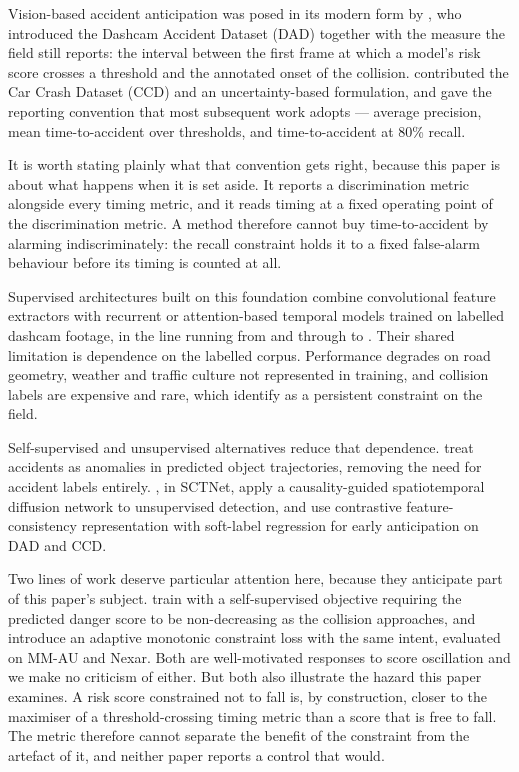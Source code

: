 Vision-based accident anticipation was posed in its modern form by \citet{chan2016dad}, who introduced the Dashcam Accident Dataset (DAD) together with the measure the field still reports: the interval between the first frame at which a model's risk score crosses a threshold and the annotated onset of the collision. \citet{bao2020ccd} contributed the Car Crash Dataset (CCD) and an uncertainty-based formulation, and \citet{karim2022dsta} gave the reporting convention that most subsequent work adopts --- average precision, mean time-to-accident over thresholds, and time-to-accident at 80\% recall.

It is worth stating plainly what that convention gets right, because this paper is about what happens when it is set aside. It reports a discrimination metric alongside every timing metric, and it reads timing at a fixed operating point of the discrimination metric. A method therefore cannot buy time-to-accident by alarming indiscriminately: the recall constraint holds it to a fixed false-alarm behaviour before its timing is counted at all.

Supervised architectures built on this foundation combine convolutional feature extractors with recurrent or attention-based temporal models trained on labelled dashcam footage, in the line running from \citet{chan2016dad} and \citet{bao2020ccd} through \citet{karim2022dsta} to \citet{kandacharam2025fusion}. Their shared limitation is dependence on the labelled corpus. Performance degrades on road geometry, weather and traffic culture not represented in training, and collision labels are expensive and rare, which \citet{zhang2025review} identify as a persistent constraint on the field.

Self-supervised and unsupervised alternatives reduce that dependence. \citet{yao2019unsupervised} treat accidents as anomalies in predicted object trajectories, removing the need for accident labels entirely. \citet{liu2026sctnet}, in SCTNet, apply a causality-guided spatiotemporal diffusion network to unsupervised detection, and \citet{zhong2025early} use contrastive feature-consistency representation with soft-label regression for early anticipation on DAD and CCD.

Two lines of work deserve particular attention here, because they anticipate part of this paper's subject. \citet{pjetri2025nondecreasing} train with a self-supervised objective requiring the predicted danger score to be non-decreasing as the collision approaches, and \citet{zou2026riskprop} introduce an adaptive monotonic constraint loss with the same intent, evaluated on MM-AU and Nexar. Both are well-motivated responses to score oscillation and we make no criticism of either. But both also illustrate the hazard this paper examines. A risk score constrained not to fall is, by construction, closer to the maximiser of a threshold-crossing timing metric than a score that is free to fall. The metric therefore cannot separate the benefit of the constraint from the artefact of it, and neither paper reports a control that would.

